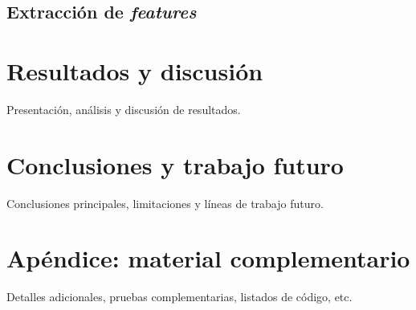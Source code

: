 \documentclass[12pt,oneside,a4paper]{report}
\begin{document}
\section{Extracción de \textit{features}}














































\chapter{Resultados y discusión}
Presentación, análisis y discusión de resultados.

\chapter{Conclusiones y trabajo futuro}
Conclusiones principales, limitaciones y líneas de trabajo futuro.

\appendix
\chapter{Apéndice: material complementario}
Detalles adicionales, pruebas complementarias, listados de código, etc.

\printbibliography
\end{document}
